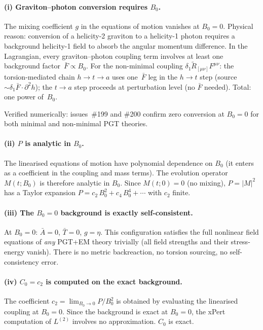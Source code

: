 \paragraph{(i) Graviton--photon conversion requires $B_0$.}
The mixing coefficient $g$ in the equations of motion vanishes at
$B_0 = 0$.  Physical reason: conversion of a helicity-2 graviton to a
helicity-1 photon requires a background helicity-1 field to absorb the
angular momentum difference.  In the Lagrangian, every graviton--photon
coupling term involves at least one background factor~$\bar{F} \propto B_0$.
For the non-minimal coupling $\delta_1 \widetilde{R}_{[\mu\nu]} F^{\mu\nu}$:
the torsion-mediated chain $h \to t \to a$ uses one~$\bar{F}$ leg in the
$h \to t$ step (source $\sim \delta_1 \bar{F} \cdot \partial^2 h$);
the $t \to a$ step proceeds at perturbation level (no $\bar{F}$ needed).
Total: one power of~$B_0$.

Verified numerically: issues~\#199 and \#200 confirm zero conversion at
$B_0 = 0$ for both minimal and non-minimal PGT theories.

\paragraph{(ii) $P$ is analytic in $B_0$.}
The linearised equations of motion have polynomial dependence on $B_0$
(it enters as a coefficient in the coupling and mass terms).  The
evolution operator $M(t; B_0)$ is therefore analytic in $B_0$.  Since
$M(t; 0) = 0$ (no mixing), $P = |M|^2$ has a Taylor expansion
$P = c_2\, B_0^2 + c_4\, B_0^4 + \cdots$ with $c_2$ finite.

\paragraph{(iii) The $B_0 = 0$ background is exactly self-consistent.}
At $B_0 = 0$: $\bar{A} = 0$, $\bar{T} = 0$, $g = \eta$.  This
configuration satisfies the full nonlinear field equations of
\emph{any} PGT+EM theory trivially (all field strengths and their
stress-energy vanish).  There is no metric backreaction, no torsion
sourcing, no self-consistency error.

\paragraph{(iv) $C_0 = c_2$ is computed on the exact background.}
The coefficient $c_2 = \lim_{B_0 \to 0} P/B_0^2$ is obtained by
evaluating the linearised coupling at $B_0 = 0$.  Since the background
is exact at $B_0 = 0$, the xPert computation of $L^{(2)}$ involves
no approximation.  $C_0$ is exact.

